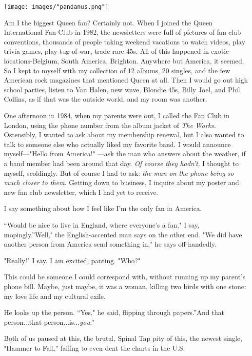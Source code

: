 \documentclass[
]{memoir}
\begin{document}
\begin{center}\texttt{[image: images/"pandanus.png"]}\end{center}

Am I the biggest Queen fan? Certainly not. When I joined the Queen
International Fan Club in 1982, the newsletters were full of pictures of
fan club conventions, thousands of people taking weekend vacations to
watch videos, play trivia games, play tug-of-war, trade rare 45s. All of
this happened in exotic locations-Belgium, South America, Brighton.
Anywhere but America, it seemed. So I kept to myself with my collection
of 12 albums, 20 singles, and the few American rock magazines that
mentioned Queen at all. Then I would go out high school parties, listen
to Van Halen, new wave, Blondie 45s, Billy Joel, and Phil Collins, as if
that was the outside world, and my room was another.

One afternoon in 1984, when my parents were out, I called the Fan Club
in London, using the phone number from the album jacket of \emph{The
Works.} Ostensibly, I wanted to ask about my membership renewal, but I
also wanted to talk to someone else who actually liked my favorite band.
I would announce myself---"Hello from America!" ---ask the man who
answers about the weather, if a band member had been around that day.
\emph{Of course they hadn't,} I thought to myself, scoldingly. But of
course I had to ask: \emph{the man on the phone being so much closer to
them.} Getting down to business, I inquire about my poster and new fan
club newsletter, which I had yet to receive.

I say something about how I feel like I'm the only fan in America.

``Would be nice to live in England, where everyone's a fan," I say,
mopingly.''Well," the English-accented man says on the other end. "We
did have another person from America send something in," he says
off-handedly.

"Really!" I say. I am excited, panting. "Who?"

This could be someone I could correspond with, without running up my
parent's phone bill. Maybe, just maybe, it was a woman, killing two
birds with one stone: my love life and my cultural exile.

He looks up the person. ``Yes," he said, flipping through papers.''And
that person...that person...is...\emph{you}."

Both of us paused at this, the brutal, Spinal Tap pity of this, the
newest single, "Hammer to Fall," failing to even dent the charts in the
U.S.
\end{document}
